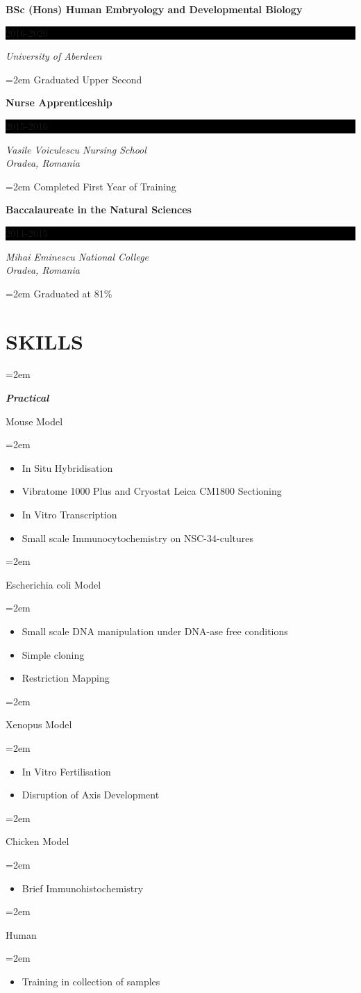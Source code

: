 \documentclass[paper=a4,fontsize=11pt]{scrartcl} %
\newlength{\spacebox}
\newcommand{\sepspace}{\vspace*{1em}}		%
\newcommand{\NewPart}[1]{\section*{\uppercase{{#1}}}}
\newcommand{\PersonalEntry}[2]{
		\noindent\hangindent=2em\hangafter=0 %
		\parbox{\spacebox}{        %
		\textit{#1}}		       %
		\hspace{1.5em} #2 \par}    %
\newcommand{\SkillsEntry}[2]{      %
		\noindent\hangindent=2em\hangafter=0 %
		\parbox{\spacebox}{        %
		\textit{#1}}			   %
		\hspace{1.5em} \parbox{6\spacebox}{#2} \par}    %
\newcommand{\EducationEntry}[4]{
		\noindent \textbf{#1} \hfill      %
		\colorbox{Black}{%
			\parbox{6em}{%
			\hfill\color{White}#2}} \par  %
		\noindent \textit{#3} \par        %
		\noindent\hangindent=2em\hangafter=0 \small #4 %
		\normalsize \par}
\begin{document}
  \EducationEntry{BSc (Hons) Human Embryology and Developmental Biology}{2016-2020}{University of Aberdeen}{Graduated Upper Second}

    \vspace{3pt}

  \EducationEntry{Nurse Apprenticeship}{2015-2016}{Vasile Voiculescu Nursing School \\ Oradea, Romania}{Completed First Year of Training}

    \vspace{3pt}

  \EducationEntry{Baccalaureate in the Natural Sciences}{2011-2015}{Mihai Eminescu National College \\ Oradea, Romania}{Graduated at 81\%}

  \NewPart{Skills}{}

  \SkillsEntry{\textbf{Practical}}{Mouse Model}
  \SkillsEntry{}{\begin{itemize}[noitemsep,topsep=0pt]
      \item In Situ Hybridisation
      \item Vibratome 1000 Plus and Cryostat Leica CM1800 Sectioning
      \item In Vitro Transcription
      \item Small scale Immunocytochemistry on NSC-34-cultures
    \end{itemize}}
    \vspace{3pt}
  \SkillsEntry{}{Escherichia coli Model}
  \SkillsEntry{}{\begin{itemize}[noitemsep,topsep=0pt]
      \item Small scale DNA manipulation under DNA-ase free conditions
      \item Simple cloning %
      \item Restriction Mapping
    \end{itemize}}
    \vspace{3pt}
  \SkillsEntry{}{Xenopus Model}
  \SkillsEntry{}{\begin{itemize}[noitemsep,topsep=0pt]
      \item In Vitro Fertilisation
      \item Disruption of Axis Development
    \end{itemize}}
    \vspace{3pt}
  \SkillsEntry{}{Chicken Model}
  \SkillsEntry{}{\begin{itemize}[noitemsep,topsep=0pt]
        \item Brief Immunohistochemistry
    \end{itemize}}
    \vspace{3pt}
  \SkillsEntry{}{Human}
  \SkillsEntry{}{\begin{itemize}[noitemsep,topsep=0pt]
      \item Training in collection of samples
    \end{itemize}}
  \sepspace
\end{document}

